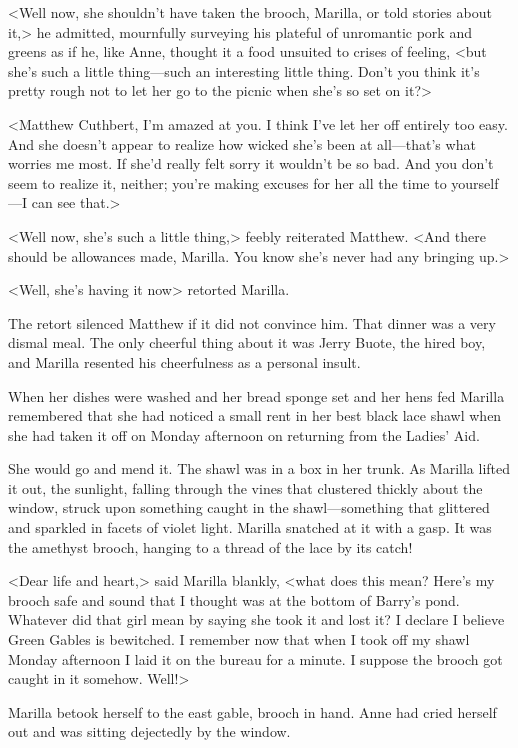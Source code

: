 <Well now, she shouldn't have taken the brooch, Marilla, or told stories about it,> he admitted, mournfully surveying his plateful of unromantic pork and greens as if he, like Anne, thought it a food unsuited to crises of feeling, <but she's such a little thing—such an interesting little thing. Don't you think it's pretty rough not to let her go to the picnic when she's so set on it?>

<Matthew Cuthbert, I'm amazed at you. I think I've let her off entirely too easy. And she doesn't appear to realize how wicked she's been at all—that's what worries me most. If she'd really felt sorry it wouldn't be so bad. And you don't seem to realize it, neither; you're making excuses for her all the time to yourself—I can see that.>

<Well now, she's such a little thing,> feebly reiterated Matthew. <And there should be allowances made, Marilla. You know she's never had any bringing up.>

<Well, she's having it now> retorted Marilla.

The retort silenced Matthew if it did not convince him. That dinner was a very dismal meal. The only cheerful thing about it was Jerry Buote, the hired boy, and Marilla resented his cheerfulness as a personal insult.

When her dishes were washed and her bread sponge set and her hens fed Marilla remembered that she had noticed a small rent in her best black lace shawl when she had taken it off on Monday afternoon on returning from the Ladies' Aid.

She would go and mend it. The shawl was in a box in her trunk. As Marilla lifted it out, the sunlight, falling through the vines that clustered thickly about the window, struck upon something caught in the shawl—something that glittered and sparkled in facets of violet light. Marilla snatched at it with a gasp. It was the amethyst brooch, hanging to a thread of the lace by its catch!

<Dear life and heart,> said Marilla blankly, <what does this mean? Here's my brooch safe and sound that I thought was at the bottom of Barry's pond. Whatever did that girl mean by saying she took it and lost it? I declare I believe Green Gables is bewitched. I remember now that when I took off my shawl Monday afternoon I laid it on the bureau for a minute. I suppose the brooch got caught in it somehow. Well!>

Marilla betook herself to the east gable, brooch in hand. Anne had cried herself out and was sitting dejectedly by the window.

